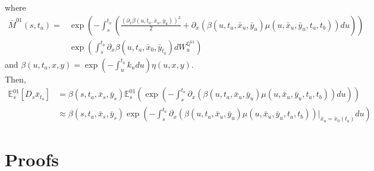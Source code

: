 \documentclass[a4paper,10pt]{article}
\newcommand{\1}{\mathbf{1}}
\begin{document}
where
\begin{align*}
\bar{M}^{01}(s,t_a) = &\exp\left(-\int_{s}^{t_a} \left(\frac{\left(\partial_x \beta(u,t_a,\bar{x}_u,\bar{y}_{u})\right)^{2}}{2} + \partial_x (\beta(u,t_a,\bar{x}_u,\bar{y}_{u}) \mu(u,\bar{x}_u,\bar{y}_u,t_a,t_b)) du \right)\right) \\
&\exp\left(\int_{s}^{t_a} \partial_x \beta(u,t_a,\bar{x}_0,\bar{y}_{t_a}) dW^{\mathbb{Q}^{01}}_u \right)
\end{align*}
and $\beta(u,t_a,x,y) = \exp\left(-\int_{u}^{t_a}k_u du\right)\eta(u,x,y)$.\\
Then, 
\begin{align}\label{approximation_E_01_Ds_x_t}
\mathbb{E}^{01}_s\left[D_s \bar{x}_{t_a}\right] &= \beta(s,t_a,\bar{x}_s,\bar{y}_s)  \mathbb{E}_s^{01}\left(\exp\left(-\int_{s}^{t_a}\partial_x (\beta(u,t_a,\bar{x}_u,\bar{y}_u) \mu(u,\bar{x}_u, \bar{y}_u,t_a,t_b)) du \right)\right) \nonumber \\
&\approx \beta(s,t_a,\bar{x}_s,\bar{y}_s) \exp\left(-\int_{s}^{t_a}\partial_x (\beta(u,t_a,\bar{x}_u,\bar{y}_u) \mu(u,\bar{x}_u, \bar{y}_u,t_a,t_b))|_{\bar{x}_u=\bar{x}_{0}(t_a)}  du \right)
\end{align}

\section{Proofs}
\end{document}

